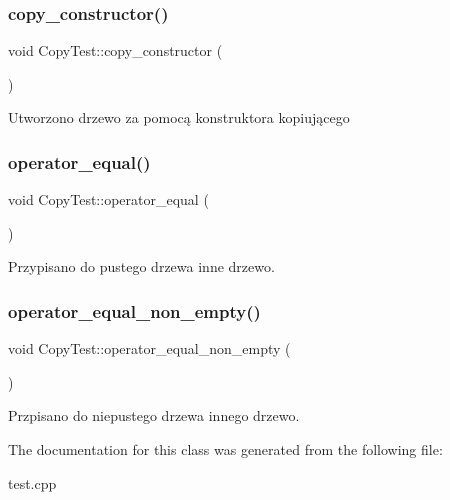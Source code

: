 \subsubsection{\texorpdfstring{copy\+\_\+constructor()}{copy\_constructor()}}
{\footnotesize\ttfamily void Copy\+Test\+::copy\+\_\+constructor (\begin{DoxyParamCaption}{ }\end{DoxyParamCaption})\hspace{0.3cm}{\ttfamily [inline]}}

Utworzono drzewo za pomocą konstruktora kopiującego \mbox{\label{class_copy_test_aea0770d1ee3defbee564d72a7d3d9a44}} 
\subsubsection{\texorpdfstring{operator\+\_\+equal()}{operator\_equal()}}
{\footnotesize\ttfamily void Copy\+Test\+::operator\+\_\+equal (\begin{DoxyParamCaption}{ }\end{DoxyParamCaption})\hspace{0.3cm}{\ttfamily [inline]}}

Przypisano do pustego drzewa inne drzewo. \mbox{\label{class_copy_test_a37811781b4c94cc5414b236290aae0d0}} 
\subsubsection{\texorpdfstring{operator\+\_\+equal\+\_\+non\+\_\+empty()}{operator\_equal\_non\_empty()}}
{\footnotesize\ttfamily void Copy\+Test\+::operator\+\_\+equal\+\_\+non\+\_\+empty (\begin{DoxyParamCaption}{ }\end{DoxyParamCaption})\hspace{0.3cm}{\ttfamily [inline]}}

Przpisano do niepustego drzewa innego drzewo. 

The documentation for this class was generated from the following file\+:\begin{DoxyCompactItemize}
\item 
test.\+cpp\end{DoxyCompactItemize}
